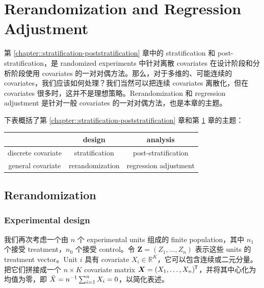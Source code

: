 
\chapter{Rerandomization and Regression Adjustment}
 \label{chapter:rerandomization-regression}


第 \ref{chapter::stratification-poststratification} 章中的 stratification 和 post-stratification，是 randomized experiments 中针对离散 covariates 在设计阶段和分析阶段使用 covariates 的一对对偶方法。那么，对于多维的、可能连续的 covariates，我们应该如何处理？我们当然可以把连续 covariates 离散化，但在 covariates 很多时，这并不是理想策略。Rerandomization 和 regression adjustment 是针对一般 covariates 的一对对偶方法，也是本章的主题。


下表概括了第 \ref{chapter::stratification-poststratification} 章和第 \ref{chapter:rerandomization-regression} 章的主题：


\begin{center}
\begin{tabular}{c|c|c}
\hline 
 & design & analysis \\ 
 \hline 
 discrete covariate & stratification & post-stratification \\
 \hline 
 general covariate & rerandomization & regression adjustment \\
 \hline 
 \end{tabular}
\end{center}

\section{Rerandomization}

\subsection{Experimental design}
我们再次考虑一个由 $n$ 个 experimental units 组成的 finite population，其中 $n_1$ 个接受 treatment，$n_0$ 个接受 control。令
 $\boldsymbol{Z} = (Z_1,\ldots, Z_n)$ 表示这些 units 的 treatment vector。Unit $i$ 具有 covariate $X_i \in \mathbb{R}^K$，它可以包含连续或二元分量。把它们拼接成一个 $n\times K$ covariate matrix $\boldsymbol{X} = (X_1 , \ldots, X_n )  ^{\mkern-1.5mu\mathsf{T}}$，并将其中心化为均值为零，即 $\bar{X}  = n^{-1} \sum_{i=1}^n X_i = 0$，以简化表述。

